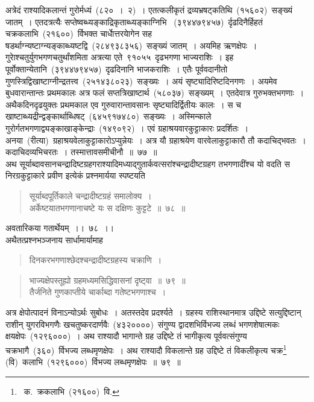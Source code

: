 \documentclass[11pt, openany]{book}
\begin{document}
अत्रेदं राश्यादिकलान्तं गुरोर्मध्यं~(८२०~।~२)~। एतत्कलीकृतं द्रव्यभ्रषट्कतिथि~(१५६०२)~सङ्ख्यं जातम्~। एतदत्रत्यैः सप्तेष्वब्ध्यङ्काद्रिकृताब्ध्यङ्काग्निभि 
~(३९४४७९४५७)~र्दृढदिनैर्हिहतं चक्रकलाभि~(२१६००)~र्विभक्त चार्धाेत्तरयाेगेन सह षडर्थाग्न्यष्टाग्न्यङ्काब्ध्यष्टद्वि~(२८४९३८३५६)~सङ्ख्यं जातम्~। अयमिह ऋणक्षेपः~। गुराेश्चतुर्युगभगणचतुर्थांशमिता अत्रत्या एते~९१०५५~दृढभगणा भाज्यराशिः~। इह पूर्वोक्तान्येतानि~(३९४४७९४५७)~दृढदिनानि भाजकराशिः~। एतैः पूर्ववदानीतो
गुणस्त्रिद्विखाष्टाग्नीन्द्रतत्त्व~(२५१४३८०२३)~सङ्ख्यः~। अयं सृष्ट्यादिरिष्टदिनगणः~। अयमेव बुधवारान्तान्तः प्रथमकालः अत्र फलं सप्तत्रिखाष्टार्थ~(५८०३७)~सङ्ख्यम्~। एतदेवात्र गुरुभक्तभगणाः~। अथैकदिनदृढयुक्तः प्रथमकाल एव गुरुवारान्तावसानः सृष्ट्यादिर्द्वितीयः कालः~। स च खाष्टाब्ध्यद्रीन्द्वङ्कार्थाब्धिषट्~(६४५९१७४८०)~सङ्ख्यः~।
अस्मिन्काले गुरोर्गतभगणाद्व्यङ्काखाङ्केन्द्राः~(१४९०९२)~। एवं ग्रहाश्रयवारकुट्टाकारः प्रदर्शितः~। अनया~(रीत्या)~ग्रहाश्रयवेलाकुट्टाकारोऽप्युन्नेयः~। अत्र यौ ग्रहाश्रयेण वारवेलाकुट्टाकारौ तौ कदाचिद्भवतः~। कदाचिदव्यभिचरतः~। तस्मात्तावसमीचीनौ~॥~७७~॥\\

\indent
अथ सूर्याब्दावसानचन्द्रादिष्टग्रहगराश्यादिमध्याद्गुतार्कवत्सरांश्चन्द्रादीष्टग्रहग
तभगणादींश्च यो वदति स निरग्रकुट्टाकारे प्रवीण इत्येकं प्रश्नमार्यया स्पष्टयति\textendash

\begin{quote}
{\ks सूर्याब्दपूर्तिकाले चन्द्रादीष्टग्रहं समालोक्य~।\\
अर्केष्टयातभगणानाचष्टे यः स दक्षिणः कुट्टटे~॥~७८~॥}
\end{quote}

अवतारिकया गतार्थेयम्~।।~७८~।।\\

\indent
अथैतत्प्रश्नभञ्जनाय सार्धामार्यामाह\textendash

\begin{quote}
{\ks दिनकरभगणाश्छेदश्चन्द्रादीष्टग्रहस्य चक्राणि~।}
\end{quote}

\newpage
\thispagestyle{fancy}
\fancyhf{}

\begin{quote}
{\ks भाज्यक्षेपस्तूह्यो ग्रहमध्यमसिद्धिवासनां दृष्ट्वा~॥~७९~॥\\
तैर्जनिते गुणकाप्तीये चार्काब्दा गतेष्टभगणाश्च~।}
\end{quote}

\indent
अत्र क्षेपोत्पादनं विनाऽन्योऽर्थः सुबोधः~। अतस्तदेव प्रदर्श्यते~। ग्रहस्य राशिस्थानमात्र उद्दिष्टे सत्युद्दिष्टान् राशीन् युगरविभगणैः खचतुष्करदार्णवैः~(४३२००००)~संगुण्य द्वादशभिर्विभज्य लब्धं भगणशेषात्मकः क्षयक्षेपः~(१२९६०००)~। अथ राश्यादौ भागान्ते ग्रह उद्दिष्टे तं भागीकृत्य पूर्ववत्संगुण्य चक्रभागै~(३६०)~र्विभज्य लब्धमृणक्षेपः~। अथ राश्यादौ विकलान्ते ग्रह उद्दिष्टे तं विकलीकृत्य चक्र\renewcommand\thefootnote{१}\footnote{~क.~क्रकलाभि~(२१६००)~वि.}  (वि)~कलाभि~(१२९६०००)~र्विभज्य लब्धमृणक्षेपः~॥~७९~॥\\
\end{document}

